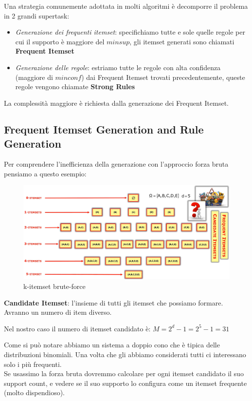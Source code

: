 Una strategia comunemente adottata in molti algoritmi \`e decomporre il problema in 2 grandi supertask:
\begin{itemize}
	\item\textit{Generazione dei frequenti itemset}: specifichiamo tutte e sole quelle regole per cui il supporto è maggiore del $minsup$, gli itemset generati sono chiamati \textbf{Frequent Itemset}
	\item \textit{Generazione delle regole}: estriamo tutte le regole con alta confidenza (maggiore di $minconf$) dai Frequent Itemset trovati precedentemente, queste regole vengono chiamate \textbf{Strong Rules}
\end{itemize}
\noindent
La complessità maggiore è richiesta dalla generazione dei Frequent Itemset.


\subsection{Frequent Itemset Generation and Rule Generation}

Per comprendere l'inefficienza della generazione con l'approccio forza bruta pensiamo a questo esempio:
\begin{figure}[H]
	\hspace{-0.7 cm}
	\includegraphics[height=0.5 \linewidth]{association/pict/k-itemset.png}
	\caption{k-itemset brute-force}
\end{figure}
\begin{defn}
	\textbf{Candidate Itemset}: l'insieme di tutti gli itemset che possiamo formare. Avranno un numero di item diverso. 
\end{defn}
Nel nostro caso il numero di itemset candidato è: $M = 2^{d} - 1 = 2^5 -1 = 31$

Come si può notare abbiamo un sistema a doppio cono che è tipica delle distribuzioni binomiali. Una volta che gli abbiamo considerati tutti ci interessano solo i più frequenti. \\
Se usassimo la forza bruta dovremmo calcolare per ogni itemset candidato il suo support count, e vedere se il suo supporto lo configura come un itemset frequente (molto dispendioso). 

